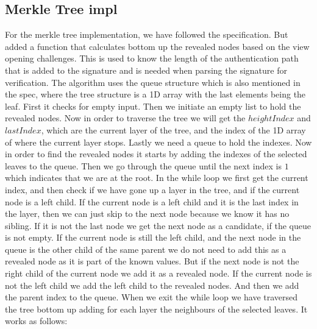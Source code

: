 \documentclass[twoside,11pt]{report}
\theoremstyle{definition}
\theoremstyle{plain}
\begin{document}
\subsection{Merkle Tree impl}\label{sub:merkle_tree_impl}
For the merkle tree implementation, we have followed the specification. But added a function that calculates bottom up the revealed nodes based on the view opening challenges. This is used to know the length of the authentication path that is added to the signature and is needed when parsing the signature for verification. The algorithm uses the queue structure which is also mentioned in the spec, where the tree structure is a 1D array with the last elements being the leaf. First it checks for empty input. Then we initiate an empty list to hold the revealed nodes. Now in order to traverse the tree we will get the $heightIndex$ and $lastIndex$, which are the current layer of the tree, and the index of the 1D array of where the current layer stops. Lastly we need a queue to hold the indexes. Now in order to find the revealed nodes it starts by adding the indexes of the selected leaves to the queue. Then we go through the queue until the next index is $1$ which indicates that we are at the root. In the while loop we first get the current index, and then check if we have gone up a layer in the tree, and if the current node is a left child. If the current node is a left child and it is the last index in the layer, then we can just skip to the next node because we know it has no sibling. If it is not the last node we get the next node as a candidate, if the queue is not empty. If the current node is still the left child, and the next node in the queue is the other child of the same parent we do not need to add this as a revealed node as it is part of the known values. But if the next node is not the right child of the current node we add it as a revealed node. If the current node is not the left child we add the left child to the revealed nodes. And then we add the parent index to the queue. When we exit the while loop we have traversed the tree bottom up adding for each layer the neighbours of the selected leaves. It works as follows:
\end{document}
